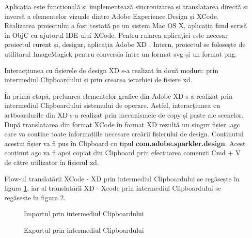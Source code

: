 Aplicația este funcțională și implementează sincronizarea și translatarea directă și inversă a elementelor vizuale dintre Adobe Experience Design și XCode. 
Realizarea proiectului a fost testată pe un sistem Mac OS X, aplicația fiind scrisă în ObjC cu ajutorul IDE-ului XCode. Pentru rularea aplicației este necesar proiectul curent \cite{repoGit} și, desigur, aplicația Adobe XD \cite{xd}.
Intern, proiectul se folosește de utilitarul ImageMagick \cite{imageMagick} pentru conversia între un format svg și un format png.

Interacțiunea cu fișierele de design XD s-a realizat în două moduri: prin intermediul Clipboardului și prin crearea ierarhiei de fișiere xd.

În primă etapă, preluarea elementelor grafice din Adobe XD s-a realizat prin intermediul Clipboardului sistemului de operare. Astfel, interacțiunea cu artboardurile din XD s-a realizat prin mecanismele de copy și paste ale scenelor.
După translatarea din format XCode în format XD rezultă un singur fișier .agc care va conține toate informațiile necesare creării fișierului de design. Conținutul acestui fișier va fi pus în Clipboard cu tipul \textbf{com.adobe.sparkler.design}. Acest conținut agc va fi apoi copiat din Clipboard prin efectuarea comenzii Cmd + V de către utilizator în fișierul xd.

Flow-ul translatării XCode - XD prin intermediul Clipboardului se regăsește în figura \ref{fig:Clipboard Import}, iar al translatării XD - Xcode prin intermediul Clipboardului se regăsește în figura \ref{fig:Clipboard Export}.


\begin{figure}[!htbp]
\centering
{}
\caption{Importul prin intermediul Clipboardului} \label{fig:Clipboard Import}
\end{figure}

\begin{figure}[!htbp]
\centering
{}
\caption{Exportul prin intermediul Clipboardului} \label{fig:Clipboard Export}
\end{figure}


